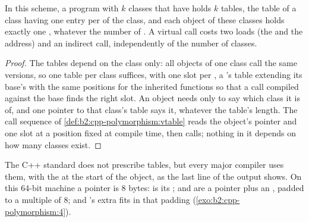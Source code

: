 \begin{proposition}\label{prop:b2:cpp-polymorphism:layout}
In this scheme, a program with $k$ classes that have  holds $k$ tables, the table of a class
having one entry per  of the class, and each object of these classes holds exactly one , whatever the number of . A virtual call costs two loads (the  and the
address) and an indirect call, independently of the number of classes.
\end{proposition}

\begin{proof}
The tables depend on the class only: all objects of one class call the same versions, so one table per class
suffices, with one slot per , a 's table extending its base's with the same positions
for the inherited functions so that a call compiled against the base finds the right slot. An object needs only to
say which class it is of, and one pointer to that class's table says it, whatever the table's length. The call
sequence of \cref{def:b2:cpp-polymorphism:vtable} reads the object's pointer and one slot at a position fixed at
compile time, then calls; nothing in it depends on how many classes exist.
\end{proof}

\label{lst:b2:cpp-polymorphism:sizes}

\label{out:b2:cpp-polymorphism:sizes}

The C++ standard does not prescribe tables, but every major compiler uses them, with the  at the start
of the object, as the last line of the output shows. On this 64-bit machine a pointer is 8 bytes:  is
its ;  and  are a pointer plus an , padded to a multiple of 8;
and 's extra  fits in that padding (\cref{exo:b2:cpp-polymorphism:4}).

